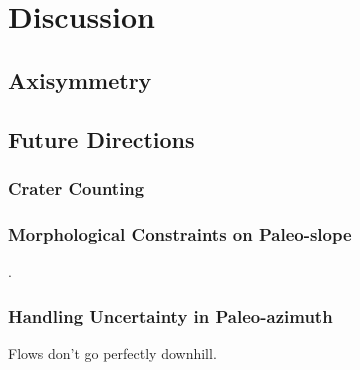 \chapter{Discussion}

\section{Axisymmetry}

\section{Future Directions}
\subsection{Crater Counting}
\textcite{kneissl_map-projection-independent_2011,robbins_volcanic_2011,
robbins_large_2013,
platz_crater-based_2013}

\subsection{Morphological Constraints on Paleo-slope}
\textcite{wadge_lobes_1991, peitersen_correlations_2000,peters_lava_2021}.

\subsection{Handling Uncertainty in Paleo-azimuth}
Flows don't go perfectly downhill.